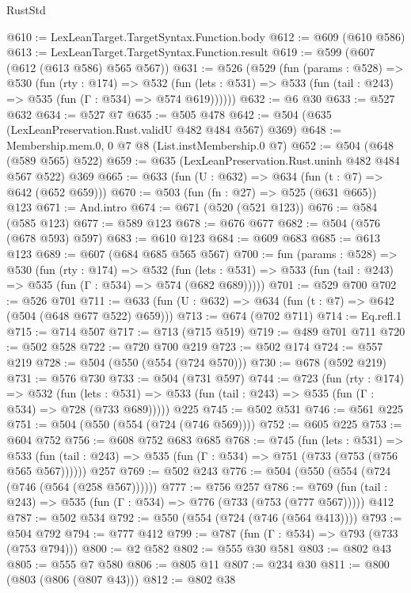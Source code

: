 \begin{lexlean}{RustStd}
\begin{coremodule}
@610 := LexLeanTarget.TargetSyntax.Function.body
@612 := @609 (@610 @586)
@613 := LexLeanTarget.TargetSyntax.Function.result
@619 := @599 (@607 (@612 (@613 @586) @565 @567))
@631 := @526
    (@529
      (fun (params : @528) =>
      @530
        (fun (rty : @174) =>
        @532
          (fun (lets : @531) => @533 (fun (tail : @243) => @535 (fun (Γ : @534) => @574 @619))))))
@632 := @6 @30
@633 := @527 @632
@634 := @527 @7
@635 := @505 @478
@642 := @504 (@635 (LexLeanPreservation.Rust.validU @482 @484 @567) @369)
@648 := Membership.mem.{0, 0} @7 @8 (List.instMembership.{0} @7)
@652 := @504 (@648 (@589 @565) @522)
@659 := @635 (LexLeanPreservation.Rust.uninh @482 @484 @567 @522) @369
@665 := @633 (fun (U : @632) => @634 (fun (t : @7) => @642 (@652 @659)))
@670 := @503 (fun (fn : @27) => @525 (@631 @665)) @123
@671 := And.intro
@674 := @671 (@520 (@521 @123))
@676 := @584 (@585 @123)
@677 := @589 @123
@678 := @676 @677
@682 := @504 (@576 (@678 @593) @597)
@683 := @610 @123
@684 := @609 @683
@685 := @613 @123
@689 := @607 (@684 @685 @565 @567)
@700 := fun (params : @528) =>
  @530
    (fun (rty : @174) =>
    @532
      (fun (lets : @531) => @533 (fun (tail : @243) => @535 (fun (Γ : @534) => @574 (@682 @689)))))
@701 := @529 @700
@702 := @526 @701
@711 := @633 (fun (U : @632) => @634 (fun (t : @7) => @642 (@504 (@648 @677 @522) @659)))
@713 := @674 (@702 @711)
@714 := Eq.refl.{1}
@715 := @714 @507
@717 := @713 (@715 @519)
@719 := @489 @701 @711
@720 := @502 @528
@722 := @720 @700 @219
@723 := @502 @174
@724 := @557 @219
@728 := @504 (@550 (@554 (@724 @570)))
@730 := @678 (@592 @219)
@731 := @576 @730
@733 := @504 (@731 @597)
@744 := @723
    (fun (rty : @174) =>
    @532
      (fun (lets : @531) => @533 (fun (tail : @243) => @535 (fun (Γ : @534) => @728 (@733 @689)))))
    @225
@745 := @502 @531
@746 := @561 @225
@751 := @504 (@550 (@554 (@724 (@746 @569))))
@752 := @605 @225
@753 := @604 @752
@756 := @608 @752 @683 @685
@768 := @745
    (fun (lets : @531) =>
    @533 (fun (tail : @243) => @535 (fun (Γ : @534) => @751 (@733 (@753 (@756 @565 @567))))))
    @257
@769 := @502 @243
@776 := @504 (@550 (@554 (@724 (@746 (@564 (@258 @567))))))
@777 := @756 @257
@786 := @769 (fun (tail : @243) => @535 (fun (Γ : @534) => @776 (@733 (@753 (@777 @567))))) @412
@787 := @502 @534
@792 := @550 (@554 (@724 (@746 (@564 @413))))
@793 := @504 @792
@794 := @777 @412
@799 := @787 (fun (Γ : @534) => @793 (@733 (@753 @794)))
@800 := @2 @582
@802 := @555 @30 @581
@803 := @802 @43
@805 := @555 @7 @580
@806 := @805 @11
@807 := @234 @30
@811 := @800 (@803 (@806 (@807 @43)))
@812 := @802 @38

\end{coremodule}
\end{lexlean}
